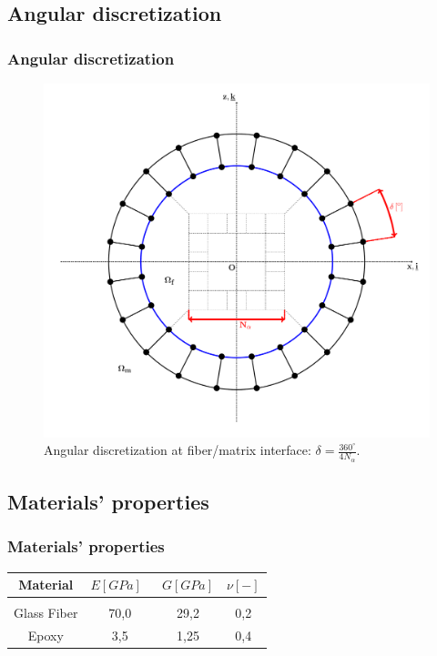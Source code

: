 \documentclass[first,firstsupp,lastsupp,handout,last,hyperref,table]{ETHclass}
\begin{document}
\subsection{Angular discretization}

\begin{frame}
\frametitle{Angular discretization}
\vspace{-0.7cm}
\centering
\captionsetup[figure]{font=scriptsize,labelfont=scriptsize}
\begin{figure}[!h]
\centering
\includegraphics[height=0.7\textheight]{mesh-disc-at-interface.pdf}
  \caption{Angular discretization at fiber/matrix interface: $\delta=\frac{360^{\circ}}{4N_{\alpha}}$.}
  \label{fig:angu-discr-def}
\end{figure}
\end{frame}

\subsection{Materials' properties}

\begin{frame}
\frametitle{Materials' properties}
\vspace{-0.7cm}
\footnotesize
\centering
\captionsetup[figure]{font=scriptsize,labelfont=scriptsize}
\begin{table}[htbp]

  \centering
    \begin{tabular}{cccc}

    \textbf{Material} & \textbf{$E\left[GPa\right]$}\ & \textbf{$G\left[GPa\right]$} & \textbf{$\nu\left[-\right]$} \\[3pt]
    \midrule\\[12pt]
    Glass Fiber    & 70,0  & 29,2   & 0,2  \\[16pt]
    Epoxy    & 3,5    & 1,25   & 0,4  

    \end{tabular}%
  \label{tab:phaseprop}%
\end{table}%
\end{frame}
\end{document}
